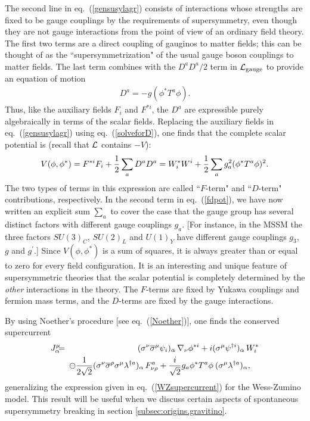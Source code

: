 \documentclass[12pt]{article}
\def\BDplus{+}
\def\BDplus{-}
\def\BDplus{\oplus}
\def\BDplus{\ominus}
\def\beq{\begin{eqnarray}}
\def\eeq{\end{eqnarray}}
\def\lagr{{\cal L}}
\def\sigmabar{\overline\sigma}
\def\half{{1\over 2}}
\begin{document}
The second line in eq.~(\ref{gensusylagr}) consists of interactions whose
strengths are fixed to be gauge couplings by the requirements of
supersymmetry, even though they are not gauge interactions from the point
of view of an ordinary field theory. The first two terms are a direct
coupling of gauginos to matter fields; this can be thought of as the
``supersymmetrization" of the usual gauge boson couplings to matter fields.
The last term combines with the $D^a D^a/2$ term in $\lagr_{\rm gauge}$ to
provide an equation of motion
\beq
D^a = -g (\phi^* T^a \phi ).
\label{solveforD}
\eeq
Thus, like the auxiliary fields $F_i$ and $F^{*i}$, the $D^a$ are
expressible purely algebraically in terms of the scalar fields. Replacing
the auxiliary fields in eq.~(\ref{gensusylagr}) using
eq.~(\ref{solveforD}), one finds that the complete scalar potential is
(recall that $\lagr$ contains $-V$): 
\beq
V(\phi,\phi^*) = F^{*i} F_i + \half \sum_a D^a D^a = W_i^* W^i +
\half \sum_a g_a^2 (\phi^* T^a \phi)^2.
\label{fdpot}
\eeq
The two types of terms in this expression are called ``$F$-term" and
``$D$-term" contributions, respectively. In the second term in
eq.~(\ref{fdpot}), we have now written an explicit sum $\sum_a$ to cover
the case that the gauge group has several distinct factors with different
gauge couplings $g_a$. [For instance, in the MSSM the three factors
$SU(3)_C$, $SU(2)_L$ and $U(1)_Y$ have different gauge couplings $g_3$,
$g$ and $g^\prime$.] Since $V(\phi,\phi^*)$ is a sum of squares, it is
always greater than or equal to zero for every field configuration. It is
an interesting and unique feature of supersymmetric theories that the
scalar potential is completely determined by the {\it other} interactions
in the theory. The $F$-terms are fixed by Yukawa couplings and fermion
mass terms, and the $D$-terms are fixed by the gauge interactions.

By using Noether's procedure [see eq.~(\ref{Noether})], one finds the
conserved supercurrent
\beq
J_\alpha^\mu &\!\!\!=\!\!\!&
(\sigma^\nu\sigmabar^\mu \psi_i)_\alpha\, \nabla_\nu \phi^{*i}
+ i (\sigma^\mu \psi^{\dagger i})_\alpha\, W_i^*
\nonumber
\\ &&
\BDplus {1\over 2 \sqrt{2}}
(\sigma^\nu \sigmabar^\rho \sigma^\mu
\lambda^{\dagger a})_\alpha\, F^a_{\nu\rho}
+ {i\over {\sqrt{2}}} g_a \phi^* T^a \phi
\> (\sigma^\mu \lambda^{\dagger a})_\alpha , \>\>\>\>{}
\label{supercurrent}
\eeq
generalizing the expression given in eq.~(\ref{WZsupercurrent}) for the
Wess-Zumino model. This result will be useful when we discuss certain
aspects of spontaneous supersymmetry breaking in section
\ref{subsec:origins.gravitino}.
\end{document}
